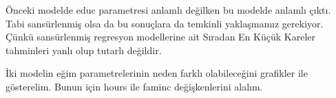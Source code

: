 \documentclass[
]{book}
\newenvironment{Shaded}{\begin{snugshade}}{\end{snugshade}}
\newcommand{\CommentTok}[1]{\textcolor[rgb]{0.56,0.35,0.01}{\textit{#1}}}
\newcommand{\DataTypeTok}[1]{\textcolor[rgb]{0.13,0.29,0.53}{#1}}
\newcommand{\DecValTok}[1]{\textcolor[rgb]{0.00,0.00,0.81}{#1}}
\newcommand{\KeywordTok}[1]{\textcolor[rgb]{0.13,0.29,0.53}{\textbf{#1}}}
\newcommand{\NormalTok}[1]{#1}
\newcommand{\OperatorTok}[1]{\textcolor[rgb]{0.81,0.36,0.00}{\textbf{#1}}}
\newcommand{\OtherTok}[1]{\textcolor[rgb]{0.56,0.35,0.01}{#1}}
\newcommand{\StringTok}[1]{\textcolor[rgb]{0.31,0.60,0.02}{#1}}
\begin{document}
Önceki modelde educ parametresi anlamlı değilken bu modelde anlamlı çıktı. Tabi sansürlenmiş olsa da bu sonuçlara da temkinli yaklaşmamız gerekiyor. Çünkü sansürlenmiş regresyon modellerine ait Sıradan En Küçük Kareler tahminleri yanlı olup tutarlı değildir.

İki modelin eğim parametrelerinin neden farklı olabileceğini grafikler ile gösterelim. Bunun için hours ile faminc değişkenlerini alalım.

\begin{Shaded}
\end{Shaded}
\end{document}
